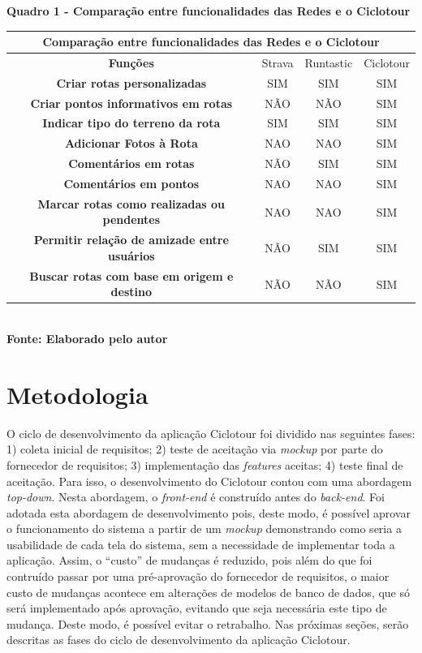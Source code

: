    \begin{center}
          \centering
       	\textbf{Quadro 1 - Comparação entre funcionalidades das Redes e o Ciclotour}\\
        \label{quadro1}
	\begin{tabular}{|c|c|c|c|} \hline
	\multicolumn{4}{|c|}{\textbf{Comparação entre funcionalidades das Redes e o Ciclotour }} 	  \\
		\hline \textbf{ Funções } & Strava & Runtastic & Ciclotour \\  
		\hline \textbf{ Criar rotas personalizadas } & SIM & SIM & SIM \\ 
		\hline \textbf{ Criar pontos informativos em rotas } & NÃO & NÃO & SIM  \\
		\hline \textbf{ Indicar tipo do terreno da rota } & SIM & SIM & SIM \\ 
		\hline \textbf{	Adicionar Fotos à Rota } & NAO & NAO & SIM \\ 
		\hline \textbf{ Comentários em rotas }	& NÃO & SIM & SIM \\ 
		\hline \textbf{	Comentários em pontos } & NAO & NAO & SIM \\ 
		\hline \textbf{	Marcar rotas como realizadas ou pendentes } & NAO & NAO & SIM \\ 
		\hline \textbf{	Permitir relação de amizade entre usuários } & NÃO & SIM & SIM \\ 
		\hline \textbf{	Buscar rotas com base em origem e destino } & NÃO & NÃO & SIM \\ 
		\hline
	\end{tabular}
	\vspace{0.1cm} 
	{\footnotesize\\ \textbf{Fonte: Elaborado pelo autor}}
   \end{center}

\section{\esp Metodologia}
O ciclo de desenvolvimento da aplicação Ciclotour foi dividido nas seguintes fases: 1) coleta inicial de requisitos; 2) teste de aceitação via 
\textit{mockup} por parte do fornecedor de requisitos; 3) implementação das \textit{features} aceitas; 4) teste final de aceitação. Para isso, 
o desenvolvimento do Ciclotour contou com uma abordagem \textit{top-down}. Nesta abordagem, o \textit{front-end} é construído antes do 
\textit{back-end}. Foi adotada esta abordagem de desenvolvimento pois, deste modo, é possível aprovar o funcionamento do sistema a partir de um 
\textit{mockup} demonstrando como seria a usabilidade de cada tela do sistema, sem a necessidade de implementar toda a aplicação. 
Assim, o ``custo'' de mudanças 
é reduzido, pois além do que foi contruído passar por uma pré-aprovação do fornecedor de requisitos, o maior custo de mudanças acontece em 
alterações de modelos de banco de dados, que só será implementado após aprovação, evitando que seja necessária este tipo de mudança. Deste modo, é 
possível evitar o retrabalho. Nas próximas seções, serão descritas as fases do ciclo de desenvolvimento da aplicação Ciclotour.

